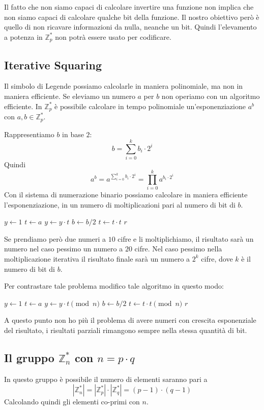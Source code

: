Il fatto che non siamo capaci di calcolare invertire una funzione non implica che 
non siamo capaci di calcolare qualche bit della funzione. Il nostro obiettivo 
però è quello di non ricavare informazioni da nulla, neanche un bit.
Quindi l'elevamento a potenza in $\mathbb{Z}_p^*$ non 
potrà essere usato per codificare.
\subsection{Iterative Squaring}
Il simbolo di Legende possiamo calcolarle in maniera polinomiale, ma 
non in maniera efficiente.
Se eleviamo un numero $a$ per $b$ non operiamo con un algoritmo efficiente.
In  $\mathbb{Z}_p^*$ è possibile calcolare in tempo polinomiale
un'esponenziazione $a^b$ con $a,b \in \mathbb{Z}_p^*$.

Rappresentiamo $b$ in base $2$:
\[
  b = \sum_{i=0}^k b_i \cdot 2^i
\]
Quindi 
\[
  a^b = a^{\sum_{i=0}^k b_i \cdot 2^i} = \prod_{i=0}^k a^{b_i \cdot 2^i}
\]
Con il sistema di numerazione binario possiamo calcolare in maniera efficiente
l'esponenziazione, in un numero di moltiplicazioni pari al numero di bit di $b$.
\begin{algorithmic}[1]
    \State $y \gets 1$
    \State $t \gets a$
        \State $y \gets y \cdot t$
      \EndIf
      \State $b \gets b / 2$
      \State $t \gets t \cdot t$
    \EndWhile
    \State \Return $r$
  \EndProcedure
\end{algorithmic}
Se prendiamo però due numeri a $10$ cifre e li moltiplichiamo, il risultato
sarà un numero nel caso pessimo un numero a $20$ cifre.
Nel caso pessimo nella moltiplicazione iterativa il risultato finale 
sarà un numero a $2^k$ cifre, dove $k$ è il numero di bit di $b$.

Per contrastare tale problema modifico tale algoritmo in questo modo:
\begin{algorithmic}[1]
    \State $y \gets 1$
    \State $t \gets a$
        \State $y \gets y \cdot t \pmod n$
      \EndIf
      \State $b \gets b / 2$
      \State $t \gets t \cdot t \pmod n$
    \EndWhile
    \State \Return $r$
  \EndProcedure
\end{algorithmic}
A questo punto non ho più il problema di avere numeri con 
crescita esponenziale del risultato, i risultati parziali rimangono 
sempre nella stessa quantità di bit.
\subsection{Il gruppo $\mathbb{Z}_n^*$ con $n = p \cdot q$}
In questo gruppo è possibile il numero di elementi saranno pari a
\[
  |\mathbb{Z}_n^*| = |\mathbb{Z}_p^*| \cdot |\mathbb{Z}_q^*| = 
  (p-1) \cdot (q-1)
\]
Calcolando quindi gli elementi co-primi con $n$.

